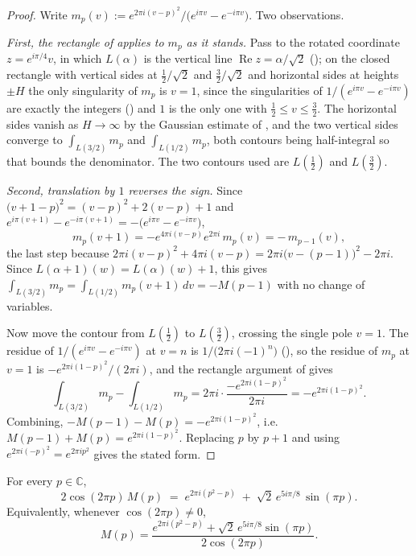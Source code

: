 \begin{proof}
\leanok
{}
Write $m_{p}(v):=e^{2\pi i(v-p)^{2}}\bigl/\bigl(e^{i\pi v}-e^{-i\pi v}\bigr)$.  Two observations.

\emph{First, the rectangle of  applies to $m_{p}$ as it stands.}  Pass to the
rotated coordinate $z=e^{i\pi/4}v$, in which $L(\alpha)$ is the vertical line
$\operatorname{Re}z=\alpha/\sqrt2$ (); on the closed rectangle with vertical
sides at $\tfrac12/\sqrt2$ and $\tfrac32/\sqrt2$ and horizontal sides at heights $\pm H$ the only
singularity of $m_{p}$ is $v=1$, since the singularities of $1/(e^{i\pi v}-e^{-i\pi v})$ are
exactly the integers () and $1$ is the only one with
$\tfrac12\le v\le\tfrac32$.  The horizontal sides vanish as $H\to\infty$ by the Gaussian estimate
of , and the two vertical sides converge to $\int_{L(3/2)}m_{p}$ and
$\int_{L(1/2)}m_{p}$, both contours being half-integral so that  bounds the
denominator.  The two contours used are $L(\tfrac12)$ and $L(\tfrac32)$.

\emph{Second, translation by $1$ reverses the sign.}  Since
$\bigl(v+1-p\bigr)^{2}=(v-p)^{2}+2(v-p)+1$ and
$e^{i\pi(v+1)}-e^{-i\pi(v+1)}=-\bigl(e^{i\pi v}-e^{-i\pi v}\bigr)$,
\[
  m_{p}(v+1)=-e^{4\pi i(v-p)}e^{2\pi i}\,m_{p}(v)=-\,m_{p-1}(v),
\]
the last step because
$2\pi i(v-p)^{2}+4\pi i(v-p)=2\pi i\bigl(v-(p-1)\bigr)^{2}-2\pi i$.
Since $L(\alpha+1)(w)=L(\alpha)(w)+1$, this gives
$\int_{L(3/2)}m_{p}=\int_{L(1/2)}m_{p}(v+1)\,dv=-M(p-1)$ with no change of variables.

Now move the contour from $L(\tfrac12)$ to $L(\tfrac32)$, crossing the single pole $v=1$.  The
residue of $1/(e^{i\pi v}-e^{-i\pi v})$ at $v=n$ is $1/\bigl(2\pi i(-1)^{n}\bigr)$
(), so the residue of $m_{p}$ at $v=1$ is
$-e^{2\pi i(1-p)^{2}}/(2\pi i)$, and the rectangle argument of  gives
\[
  \int_{L(3/2)}m_{p}-\int_{L(1/2)}m_{p}=2\pi i\cdot\frac{-e^{2\pi i(1-p)^{2}}}{2\pi i}
  =-e^{2\pi i(1-p)^{2}} .
\]
Combining, $-M(p-1)-M(p)=-e^{2\pi i(1-p)^{2}}$, i.e.
$M(p-1)+M(p)=e^{2\pi i(1-p)^{2}}$.  Replacing $p$ by $p+1$ and using
$e^{2\pi i(-p)^{2}}=e^{2\pi ip^{2}}$ gives the stated form.
\end{proof}

\begin{theorem}
\label{thm:rsf_model_closed}
\leanok
{}
For every $p\in\mathbb{C}$,
\[
  2\cos(2\pi p)\,M(p)\;=\;e^{2\pi i\left(p^{2}-p\right)}\;+\;\sqrt2\,e^{5i\pi/8}\,\sin(\pi p).
\]
Equivalently, whenever $\cos(2\pi p)\ne0$,
\[
  M(p)=\frac{e^{2\pi i\left(p^{2}-p\right)}+\sqrt2\,e^{5i\pi/8}\sin(\pi p)}{2\cos(2\pi p)} .
\]
\end{theorem}

